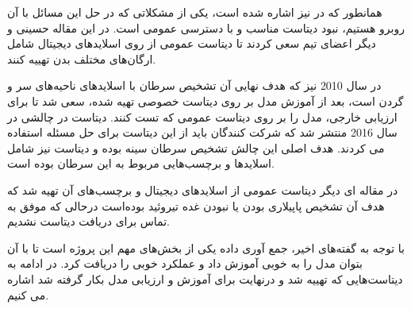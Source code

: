 
همانطور که در \cite{hosseini2019atlas} نیز اشاره شده است، یکی از مشکلاتی که در حل این مسائل با آن روبرو هستیم، نبود دیتاست مناسب و با دسترسی عمومی است. در این مقاله حسینی و دیگر اعضای تیم سعی کردند تا دیتاست عمومی از روی اسلاید‌های دیجیتال شامل ارگان‌های مختلف بدن تهییه کنند.

در سال 2010 \cite{halicek2019head} نیز که هدف نهایی آن تشخیص سرطان با اسلاید‌های ناحیه‌های سر و گردن است، بعد از آموزش مدل بر روی دیتاست خصوصی تهیه شده، سعی شد تا برای ارزیابی خارجی، مدل را بر روی دیتاست عمومی  که تست کنند. دیتاست  در چالشی در سال 2016 منتشر شد که شرکت کنندگان باید از این دیتاست برای حل مسئله استفاده می کردند. هدف اصلی این چالش تشخیص سرطان سینه بوده و دیتاست نیز شامل اسلاید‌ها و برچسب‌هایی مربوط به این سرطان بوده است.

در مقاله ای دیگر \cite{bohland2021machine} دیتاست عمومی از اسلاید‌های دیجیتال و برچسب‌های آن تهیه شد که هدف آن تشخیص پاپیلاری بودن یا نبودن غده تیروئید بوده‌است درحالی که موفق به تماس برای دریافت دیتاست نشدیم.

با توجه به گفته‌های اخیر، جمع آوری داده یکی از بخش‌های مهم این پروژه است تا با آن بتوان مدل را به خوبی آموزش داد و عملکرد خوبی را دریافت کرد.
در ادامه به دیتاست‌هایی که تهییه شد و درنهایت برای آموزش و ارزیابی مدل بکار گرفته شد اشاره می کنیم.



